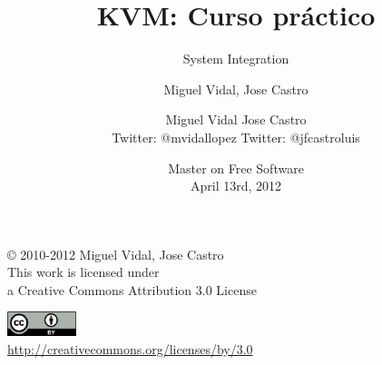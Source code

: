 \documentclass{beamer}
\begin{document}
\title{KVM: Curso práctico}
\subtitle{System Integration}
\author{Miguel Vidal, Jose Castro} 
\date{\footnotesize{Master on Free Software \\ April 13rd, 2012}}
\author{Miguel Vidal \hspace{1cm} Jose Castro \\
\hspace{0.5mm} {\tiny Twitter: @mvidallopez \hspace{1.1cm}Twitter: @jfcastroluis}
}



\begin{frame}
  \vspace{2cm}
  \begin{flushright}
    {\small \copyright{} 2010-2012 Miguel Vidal, Jose Castro} \\
    \medskip
    {\scriptsize This work is licensed under \\ a Creative Commons Attribution 3.0 License}
  \end{flushright}
  \begin{flushright}
    \href{http://creativecommons.org/licenses/by/3.0/es}{\includegraphics[width=2cm]{format/cc-by.png}} \\
    {\tiny \url{http://creativecommons.org/licenses/by/3.0}}
  \end{flushright}
\end{frame}%

\usebackgroundtemplate{}

\end{document}
